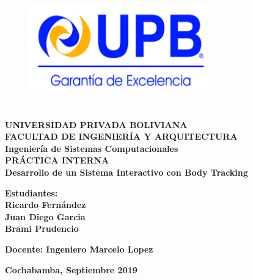 \begin{titlepage}
	
	\makeatletter
	\setlength{\@fptop}{0pt}
	\makeatother
\begin{figure}[t!]
	\centering
	\includegraphics[width=8cm,height=5cm,]{./Images/Logo_Upb.png}
\end{figure}
\begin{center}
	\textbf{
		\large{UNIVERSIDAD PRIVADA BOLIVIANA\\
		FACULTAD DE INGENIERÍA Y ARQUITECTURA\\
		Ingeniería de Sistemas Computacionales\\[1cm]}
		\huge{PRÁCTICA INTERNA}\\[2cm]
		\Huge{Desarrollo de un Sistema Interactivo con Body Tracking}
	}\\[3cm]
\end{center} 
\textbf{Estudiantes: \\}
\textbf{
		Ricardo Fernández\\
		Juan Diego Garcia\\
		Brami Prudencio\\[1cm]
	}
\begin{center}
		\textbf{
		Docente:
		Ingeniero Marcelo Lopez\\[2cm]
	}
\end{center} 
	\begin{center}
		\textbf{Cochabamba, Septiembre 2019}
	\end{center}

\end{titlepage}